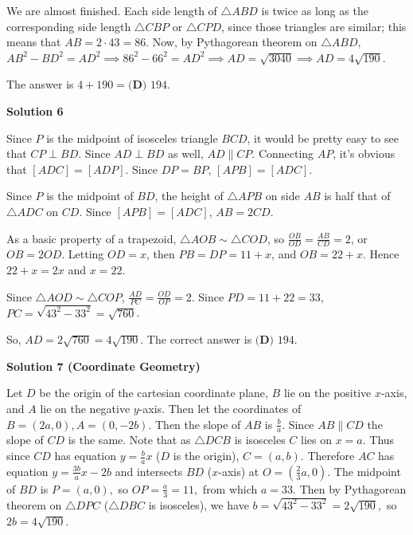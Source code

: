 \begin{enumerate}
 We are almost finished. Each side length of $\triangle ABD$ is twice as long as the corresponding side length $\triangle CBP$ or $\triangle CPD$, since those triangles are similar; this means that $AB = 2 \cdot 43 = 86$. Now, by Pythagorean theorem on $\triangle ABD$, $AB^{2} - BD^{2} = AD^{2} \implies 86^{2}-66^{2} = AD^{2} \implies AD = \sqrt{3040} \implies AD = 4 \sqrt{190}$. 

 The answer is $4+190 = \boxed{\textbf{(D) }194}$.

 



\textbf{Solution 6}

Since $P$ is the midpoint of isosceles triangle $BCD$, it would be pretty easy to see that $CP\perp BD$. Since $AD\perp BD$ as well, $AD\parallel CP$. Connecting $AP$, it’s obvious that $[ADC]=[ADP]$. Since $DP=BP$, $[APB]=[ADC]$. 

 Since $P$ is the midpoint of $BD$, the height of $\triangle APB$ on side $AB$ is half that of $\triangle ADC$ on $CD$. Since $[APB]=[ADC]$, $AB=2CD$. 

 As a basic property of a trapezoid, $\triangle AOB \sim \triangle COD$, so $\frac{OB}{OD}=\frac{AB}{CD}=2$, or $OB=2OD$. Letting $OD=x$, then $PB=DP=11+x$, and $OB=22+x$. Hence $22+x=2x$ and $x=22$.

 Since $\triangle AOD \sim \triangle COP$, $\frac{AD}{PC}=\frac{OD}{OP}=2$. Since $PD=11+22=33$, $PC=\sqrt{43^2-33^2}=\sqrt{760}$.

 So, $AD=2\sqrt{760}=4\sqrt{190}$. The correct answer is $\boxed{\textbf{(D) }194}$.

 



\textbf{Solution 7 (Coordinate Geometry)}

Let $D$ be the origin of the cartesian coordinate plane, $B$ lie on the positive $x$-axis, and $A$ lie on the negative $y$-axis. Then let the coordinates of $B = (2a,0), A = (0, -2b).$ Then the slope of $AB$ is $\frac{b}{a}.$ Since $AB \parallel CD$ the slope of $CD$ is the same. Note that as $\triangle DCB$ is isosceles $C$ lies on $x = a.$ Thus since $CD$ has equation $y = \frac{b}{a}x$ ($D$ is the origin), $C = (a,b).$ Therefore $AC$ has equation $y = \frac{3b}{a}x - 2b$ and intersects $BD$ ($x$-axis) at $O =\left(\frac{2}{3}a, 0\right).$ The midpoint of $BD$ is $P = (a,0),$ so $OP = \frac{a}{3} = 11,$ from which $a = 33.$ Then by Pythagorean theorem on $\triangle DPC$ ($\triangle DBC$ is isosceles), we have $b = \sqrt{43^2 - 33^2} = 2\sqrt{190},$ so $2b=4\sqrt{190}.$


\end{enumerate}
